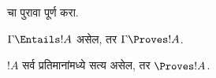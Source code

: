 \documentclass[../../../include/open-logic-section]{subfiles}
\begin{document}
\begin{prob}
 चा
पुरावा पूर्ण करा.
\end{prob}

\begin{cor}
$\Gamma \Entails !A$ असेल, तर
$\Gamma \Proves !A$.
\end{cor}

\begin{cor}
$!A$ सर्व प्रतिमानांमध्ये सत्य असेल,
तर $\Proves !A$.
\end{cor}
\end{document}
